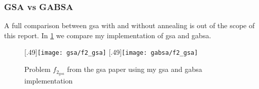 \subsubsection*{GSA vs GABSA}
A full comparison between \ac{gsa} with and without annealing is out of the scope of this report. In \cref{fig:f2comp} we compare my implementation of \ac{gsa} and \ac{gabsa}.
%
\begin{figure}[h]
	\centering
		[.49\linewidth]{\texttt{[image: gsa/f2\_gsa]}}
		[.49\linewidth]{\texttt{[image: gabsa/f2\_gsa]}}
	\caption{Problem $f_{2_{gsa}}$ from the \ac{gsa} paper\cite{GSA} using my \ac{gsa} and \ac{gabsa} implementation}
    \label{fig:f2comp}
\end{figure}
\clearpage
